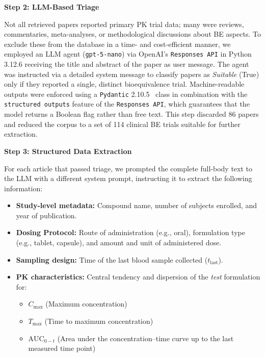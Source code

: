 \textbf{Step 2: LLM-Based Triage}
\label{app:triage}

Not all retrieved papers reported primary PK trial data; many were reviews, commentaries, meta-analyses, or methodological discussions about BE aspects.
%
To exclude these from the database in a time- and cost-efficient manner, we employed an LLM agent (\texttt{gpt-5-nano}) via OpenAI's \texttt{Responses API} in Python 3.12.6 receiving the title and abstract of the paper as user message.
%
The agent was instructed via a detailed system message to classify papers as \textit{Suitable} (True) only if they reported a single, distinct bioequivalence trial.
%
Machine-readable outputs were enforced using a \texttt{Pydantic} 2.10.5~\citep{pydantic_validation} class in combination with the \texttt{structured outputs} feature of the \texttt{Responses API}, which guarantees that the model returns a  Boolean flag rather than free text.
%
This step discarded 86 papers and reduced the corpus to a set of 114 clinical BE trials suitable for further extraction.

\textbf{Step 3: Structured Data Extraction}
\label{app:extraction}

For each article that passed triage, we prompted the complete full-body text to the LLM with a different system prompt, instructing it to extract the following information:
%
\begin{itemize}
    \item \textbf{Study-level metadata:} Compound name, number of subjects enrolled, and year of publication.
    \item \textbf{Dosing Protocol:} Route of administration (e.g., oral), formulation type (e.g., tablet, capsule), and amount and unit of administered dose.
    \item \textbf{Sampling design:} Time of the last blood sample collected ($t_{\text{last}}$).
    \item \textbf{PK characteristics:} Central tendency and dispersion of the \textit{test} formulation for:
    \begin{itemize}
        \item $C_{\max}$ (Maximum concentration)
        \item $T_{\max}$ (Time to maximum concentration)
        \item $\text{AUC}_{0-t}$ (Area under the concentration--time curve up to the last measured time point)
    \end{itemize}
\end{itemize}



